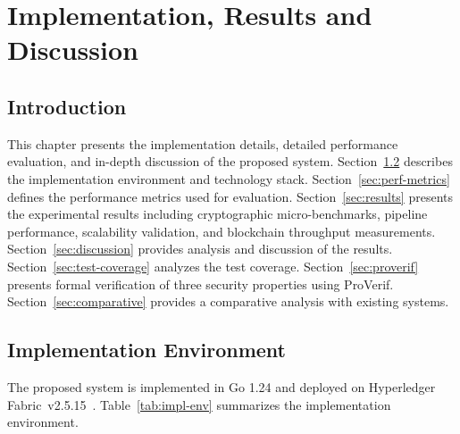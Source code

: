 \chapter{Implementation, Results and Discussion}
\label{ch:results}

\section{Introduction}
\label{sec:res-intro}

This chapter presents the implementation details, detailed performance evaluation, and in-depth discussion of the proposed system. Section~\ref{sec:impl-env} describes the implementation environment and technology stack. Section~\ref{sec:perf-metrics} defines the performance metrics used for evaluation. Section~\ref{sec:results} presents the experimental results including cryptographic micro-benchmarks, pipeline performance, scalability validation, and blockchain throughput measurements. Section~\ref{sec:discussion} provides analysis and discussion of the results. Section~\ref{sec:test-coverage} analyzes the test coverage. Section~\ref{sec:proverif} presents formal verification of three security properties using ProVerif. Section~\ref{sec:comparative} provides a comparative analysis with existing systems.

\section{Implementation Environment}
\label{sec:impl-env}

The proposed system is implemented in Go 1.24 and deployed on Hyperledger Fabric~v2.5.15~\cite{androulaki2018}. Table~\ref{tab:impl-env} summarizes the implementation environment.

